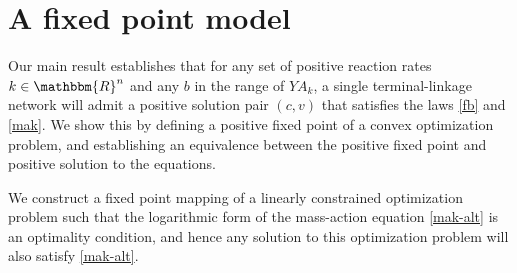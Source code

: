 \documentclass[smallextended]{svjour3}       %
\newcommand*{\0}{\mathbf{0}}
\newcommand*{\1}{\mathbf{1}}
\newcommand*{\R}{\mathbbm{R}}
\begin{document}
\section{A fixed point model} 
\label{section:fp-model}

Our main result establishes that for any set of positive reaction rates
$k\in\R^n$ and any $b$ in the range of $YA_k$, a single terminal-linkage
network will admit a positive solution pair $(c,v)$ that satisfies the laws
\eqref{fb} and \eqref{mak}.  We show this by defining a positive fixed point of
a convex optimization problem, and establishing an equivalence between the
positive fixed point and positive solution to the equations.

We construct a fixed point mapping of a linearly constrained optimization
problem such that the logarithmic form of the mass-action equation
\eqref{mak-alt} is an optimality condition, and hence any solution to this
optimization problem will also satisfy \eqref{mak-alt}.
\end{document}
